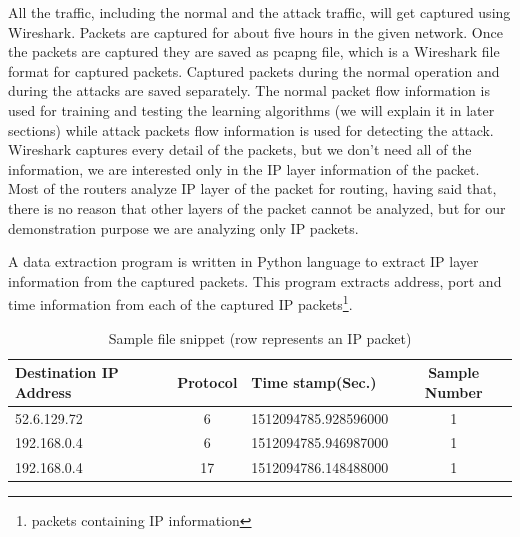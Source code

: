 \documentclass[12pt,oneside,a4paper]{article}
\begin{document}
All the traffic, including the normal and the attack traffic, will get captured using Wireshark. Packets are captured for about five hours in the given network. Once the packets are captured they are saved as pcapng file, which is a Wireshark file format for captured packets. Captured packets during the normal operation and during the attacks are saved separately. The normal packet flow information is used for training and testing the learning algorithms (we will explain it in later sections) while attack packets flow information is used for detecting the attack. Wireshark captures every detail of the packets, but we don't need all of the information, we are interested only in the IP layer information of the packet. Most of the routers analyze IP layer of the packet for routing, having said that, there is no reason that other layers of the packet cannot be analyzed, but for our demonstration purpose we are analyzing only IP packets.\par

A data extraction program is written in Python language to extract IP layer information from the captured packets. This program extracts address, port and time information from each of the captured IP packets\footnote{packets containing IP information}.

\begin{table}[H]
\centering
  \begin{tabular}{| l | c | l | c |}
    \hline
    Destination IP Address      & Protocol  & Time stamp(Sec.)  & Sample Number \\
    \hline
    52.6.129.72         & 6         & 1512094785.928596000  & 1 \\ \hline
    192.168.0.4         & 6         & 1512094785.946987000  & 1 \\ \hline
    192.168.0.4         & 17        & 1512094786.148488000  & 1 \\ \hline
  \end{tabular}
\caption{Sample file snippet (row represents an IP packet)} \label{table:sample-file-snippet}
\end{table}
\end{document}
